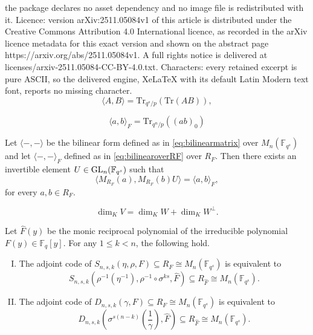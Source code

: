 \documentclass[10pt,a4paper]{amsart}
\newcommand{\F}{{\mathbb F}}
\newcommand{\GL}{\hbox{{\rm GL}}}
\newcommand{\Tr}{{\mathrm{Tr}}}
\begin{document}
the package declares no asset dependency and no image file is redistributed with it. Licence: version arXiv:2511.05084v1 of this article is distributed under the Creative Commons Attribution 4.0 International licence, as recorded in the arXiv licence metadata for this exact version and shown on the abstract page https://arxiv.org/abs/2511.05084v1. A full rights notice is delivered at licenses/arxiv-2511.05084-CC-BY-4.0.txt. Characters: every retained excerpt is pure ASCII, so the delivered engine, XeLaTeX with its default Latin Modern text font, reports no missing character.
\begin{equation} \label{eq:bilinearmatrix}
\langle A,B \rangle=\Tr_{q^s/p}(\Tr(AB)),
\end{equation}

    \begin{equation} \label{eq:bilinearoverRF}
    \langle a,b \rangle_F=\Tr_{q^n/p}\left((ab)_0\right)%
     \end{equation}

\begin{theorem} \label{th:correspondencebilinear}
Let $\langle -,- \rangle$ be the bilinear form defined as in \eqref{eq:bilinearmatrix} over $M_n(\F_{q^s})$ and let $\langle -, -\rangle_F$ defined as in \eqref{eq:bilinearoverRF} over $R_F$.
Then there exists an invertible element $U \in \GL_n(\F_{q^s})$ such that 
\[
\langle M_{R_F}(a), M_{R_F}(b) U  \rangle= \langle a,b \rangle_F,
\]
for every $a,b \in R_F$.
\end{theorem}

\begin{equation} \label{eq:dimensionalformula}
\dim_K V = \dim_K W + \dim_K W^\perp.
\end{equation}

\begin{proposition} \label{prop:determinantionadjoint}
Let $\hat{F}(y)$ be the monic reciprocal polynomial of the irreducible polynomial $F(y) \in \F_q[y]$. For any $1 \leq k<n$, the following hold. 

\begin{enumerate}[I)]
\item\label{adjointS} The adjoint code of $S_{n,s,k}(\eta,\rho,F) \subseteq R_F \cong M_n(\F_{q^s})$ is equivalent to
\[
S_{n,s,k}(\rho^{-1}(\eta^{-1}),\rho^{-1}\circ \sigma^{ks},\hat{F}) \subseteq R_{\hat{F}} \cong M_n(\F_{q^s}).
\]
\item\label{adjointD} The adjoint code of  $D_{n,s,k}(\gamma,F) \subseteq R_F \cong M_n(\F_{q^s})$ is equivalent to
 \[D_{n,s,k}\left(\sigma^{s(n-k)}\left(\frac{1}{\gamma}\right),\hat{F}\right)\subseteq R_{\hat{F}} \cong M_n(\F_{q^s}).
 \]
\end{enumerate}
\end{proposition}
\end{document}
